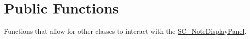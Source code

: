 \hypertarget{group___s_c___n_d_p_pub_func}{}\section{Public Functions}
\label{group___s_c___n_d_p_pub_func}
Functions that allow for other classes to interact with the \hyperlink{class_s_c___note_display_panel}{S\+C\+\_\+\+Note\+Display\+Panel}. 